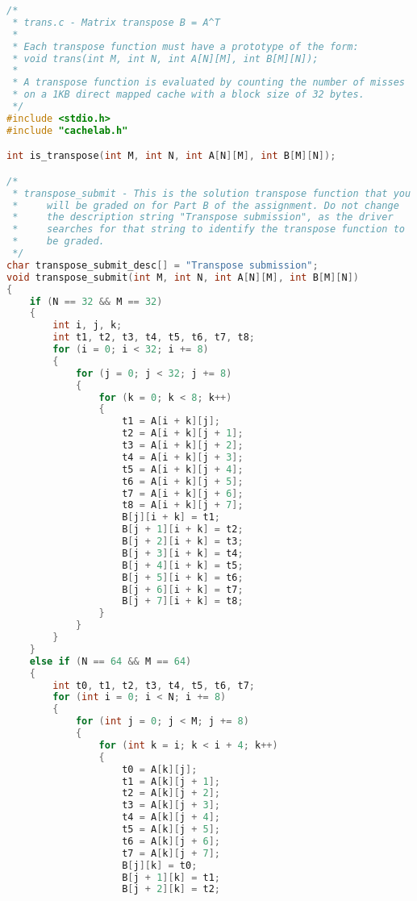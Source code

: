 \begin{lstlisting}[language = C,title= Coding in C]
/*
 * trans.c - Matrix transpose B = A^T
 *
 * Each transpose function must have a prototype of the form:
 * void trans(int M, int N, int A[N][M], int B[M][N]);
 *
 * A transpose function is evaluated by counting the number of misses
 * on a 1KB direct mapped cache with a block size of 32 bytes.
 */
#include <stdio.h>
#include "cachelab.h"

int is_transpose(int M, int N, int A[N][M], int B[M][N]);

/*
 * transpose_submit - This is the solution transpose function that you
 *     will be graded on for Part B of the assignment. Do not change
 *     the description string "Transpose submission", as the driver
 *     searches for that string to identify the transpose function to
 *     be graded.
 */
char transpose_submit_desc[] = "Transpose submission";
void transpose_submit(int M, int N, int A[N][M], int B[M][N])
{
    if (N == 32 && M == 32)
    {
        int i, j, k;
        int t1, t2, t3, t4, t5, t6, t7, t8;
        for (i = 0; i < 32; i += 8)
        {
            for (j = 0; j < 32; j += 8)
            {
                for (k = 0; k < 8; k++)
                {
                    t1 = A[i + k][j];
                    t2 = A[i + k][j + 1];
                    t3 = A[i + k][j + 2];
                    t4 = A[i + k][j + 3];
                    t5 = A[i + k][j + 4];
                    t6 = A[i + k][j + 5];
                    t7 = A[i + k][j + 6];
                    t8 = A[i + k][j + 7];
                    B[j][i + k] = t1;
                    B[j + 1][i + k] = t2;
                    B[j + 2][i + k] = t3;
                    B[j + 3][i + k] = t4;
                    B[j + 4][i + k] = t5;
                    B[j + 5][i + k] = t6;
                    B[j + 6][i + k] = t7;
                    B[j + 7][i + k] = t8;
                }
            }
        }
    }
    else if (N == 64 && M == 64)
    {
        int t0, t1, t2, t3, t4, t5, t6, t7;
        for (int i = 0; i < N; i += 8)
        {
            for (int j = 0; j < M; j += 8)
            {
                for (int k = i; k < i + 4; k++)
                {
                    t0 = A[k][j];
                    t1 = A[k][j + 1];
                    t2 = A[k][j + 2];
                    t3 = A[k][j + 3];
                    t4 = A[k][j + 4];
                    t5 = A[k][j + 5];
                    t6 = A[k][j + 6];
                    t7 = A[k][j + 7];
                    B[j][k] = t0;
                    B[j + 1][k] = t1;
                    B[j + 2][k] = t2;

\end{lstlisting}
